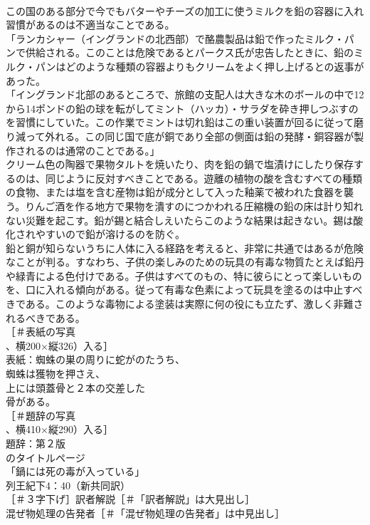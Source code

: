 \documentclass[8pt]{extreport}
\begin{document}
\begin{CJK}{UTF8}{min}
\\	この国のある部分で今でもバターやチーズの加工に使うミルクを鉛の容器に入れ習慣があるのは不適当なことである。
\\	「ランカシャー（イングランドの北西部）で酪農製品は鉛で作ったミルク・パンで供給される。このことは危険であるとパークス氏が忠告したときに、鉛のミルク・パンはどのような種類の容器よりもクリームをよく押し上げるとの返事があった。
\\	「イングランド北部のあるところで、旅館の支配人は大きな木のボールの中で12から14ポンドの鉛の球を転がしてミント（ハッカ）・サラダを砕き押しつぶすのを習慣にしていた。この作業でミントは切れ鉛はこの重い装置が回るに従って磨り減って外れる。この同じ国で底が銅であり全部の側面は鉛の発酵・銅容器が製作されるのは通常のことである。」
\\	クリーム色の陶器で果物タルトを焼いたり、肉を鉛の鍋で塩漬けにしたり保存するのは、同じように反対すべきことである。遊離の植物の酸を含むすべての種類の食物、または塩を含む産物は鉛が成分として入った釉薬で被われた食器を襲う。りんご酒を作る地方で果物を潰すのにつかわれる圧縮機の鉛の床は計り知れない災難を起こす。鉛が錫と結合しえいたらこのような結果は起きない。錫は酸化されやすいので鉛が溶けるのを防ぐ。
\\	鉛と銅が知らないうちに人体に入る経路を考えると、非常に共通ではあるが危険なことが判る。すなわち、子供の楽しみのための玩具の有毒な物質たとえば鉛丹や緑青による色付けである。子供はすべてのもの、特に彼らにとって楽しいものを、口に入れる傾向がある。従って有毒な色素によって玩具を塗るのは中止すべきである。このような毒物による塗装は実際に何の役にも立たず、激しく非難されるべきである。
\\	［＃表紙の写真
\\	、横200×縦326）入る］
\\	表紙：蜘蛛の巣の周りに蛇がのたうち、
\\	蜘蛛は獲物を押さえ、
\\	上には頭蓋骨と２本の交差した
\\	骨がある。
\\	［＃題辞の写真
\\	、横410×縦290）入る］
\\	題辞：第２版
\\	のタイトルページ
\\	「鍋には死の毒が入っている」
\\	列王紀下4：40（新共同訳）
\\	［＃３字下げ］訳者解説［＃「訳者解説」は大見出し］
\\	混ぜ物処理の告発者［＃「混ぜ物処理の告発者」は中見出し］

\end{CJK}
\end{document}
